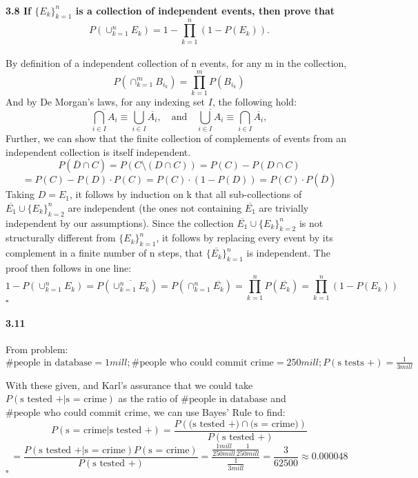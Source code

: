 \documentclass[letterpaper,12pt]{article}
\theoremstyle{definition}
\begin{document}
\begin{enumerate}
    \paragraph{3.8 If $\{E_k\}_{k = 1}^n$ is a collection of independent events, then prove that $$ P(\cup_{k = 1}^n E_k) = 1 - \prod_{k = 1}^n (1 - P(E_k)) .$$} 
    By  definition of  a independent collection of n events, for any m in the collection, $$ P(\cap_{k = 1}^m B_{i_k}) = \prod_{k = 1}^m P(B_{i_k})  $$ 
    And by De Morgan's  laws, for any indexing set $I$, the following hold: 
    $$\overline{\bigcap_{i \in I} A_{i}} \equiv \bigcup_{i \in I} \overline{A_{i}}, \quad \text{and} \quad \overline{\bigcup_{i \in I} A_{i}} \equiv \bigcap_{i \in I} \overline{A_{i}},$$
    Further,  we can show that the  finite collection of  complements of  events from an independent collection  is  itself independent. 
    $$P(\overline{D} \cap C) = P(C \setminus (D \cap C)) = P(C) - P(D \cap C) $$ $$= P(C) - P(D) \cdot P(C) = P(C) \cdot (1 - P(D)) = P(C) \cdot P(\overline{D})$$
    Taking $ D = E_1$, it follows by induction on k that all sub-collections of $\overline{E_1} \cup \{E_k\}_{k = 2}^n$ are independent (the ones not containing $\overline{E_1}$ are trivially independent by our assumptions). 
    Since the collection $\overline{E_1} \cup \{E_k\}_{k = 2}^n$ is  not structurally different from  $\{E_k\}_{k = 1}^n$,  it follows by replacing every event by its complement in a finite number of n steps, that  $\{\overline{E_k}\}_{k = 1}^n$ is  independent.
    The  proof then follows in one line:
    $$ 1 - P(\cup_{k = 1}^n E_k) = P(\overline{\cup_{k = 1}^n E_k}) = P(\cap_{k = 1}^n \overline{E_k} ) = \prod_{k = 1}^n P(\overline{E_k}) =  \prod_{k = 1}^n (1 - P(E_k)) $$ $\square$
    
    \paragraph{3.11} From problem: $\#\text{people in database} =  1 mill; \#\text{people who could commit crime} = 250 mill; P(\text{s tests +}) = \frac{1}{3mill}$
    
    With these given, and Karl's assurance that we could take $P(\text{s tested +}| \text{s = crime})$ as the ratio of $\#\text{people in database}$ and $\#\text{people who could commit crime}$, we can use Bayes' Rule to find: $$P(\text{s = crime}|\text{s tested +}) 
    = \frac{P(\text{(s tested +)}\cap \text{(s = crime)})}{P(\text{s tested +})}$$
$$    = \frac{P(\text{s tested +}| \text{s = crime})P(\text{s = crime})}{P(\text{s tested +})} = \frac{\frac{1 mill}{250 mill} \frac{1}{250mill}}{\frac{1}{3 mill}} = \frac{3}{62500} \approx 0.000048$$
$\square$
    

\end{enumerate}
\end{document}
